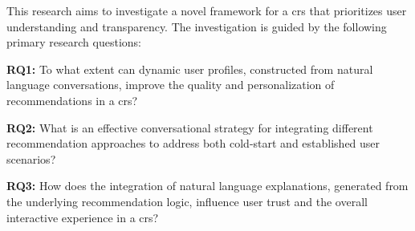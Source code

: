 This research aims to investigate a novel framework for a \ac{crs} that prioritizes user understanding and transparency. The investigation is guided by the following primary research questions:

\begin{compactenum}
    \item[\textbf{RQ1:}] To what extent can dynamic user profiles, constructed from natural language conversations, improve the quality and personalization of recommendations in a \ac{crs}?
    \item[\textbf{RQ2:}] What is an effective conversational strategy for integrating different recommendation approaches to address both cold-start and established user scenarios?
    \item[\textbf{RQ3:}] How does the integration of natural language explanations, generated from the underlying recommendation logic, influence user trust and the overall interactive experience in a \ac{crs}?
\end{compactenum}